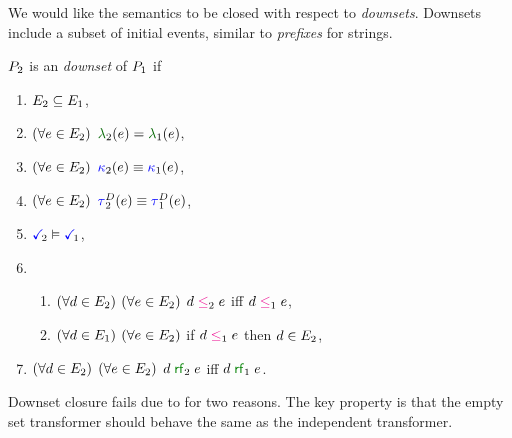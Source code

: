 We would like the semantics to be closed with respect to \emph{downsets}.
Downsets include a subset of initial events, similar to \emph{prefixes} for
strings.
\begin{definition}
  \label{def:downset}
  $P_2$ is an \emph{downset} of $P_1$ if
  \begin{multicols}{2}
    \begin{enumerate}
    \item $E_2\subseteq E_1$,
    \item $(\forall e\in E_2)$ $\labelingAct_2(\aEv)=\labelingAct_1(\aEv)$,
    \item $(\forall e\in E_2)$ ${\color{blue}\kappa}_2(e)\mathrel{\equiv}{\color{blue}\kappa}_1(e)$,
    \item $(\forall e\in E_2)$ $\aTr[2]{\bEvs}{\aEv}\riff\aTr[1]{\bEvs}{\aEv}$,
    \item $\aTerm[2] \rimplies \aTerm[1]$,
    \item[] 
      \begin{enumerate}[leftmargin=0pt]
      \item $(\forall d\in E_2)$ $(\forall e\in E_2)$ $\bEv\le_2\aEv$ iff $\bEv\le_1\aEv$,
      \item $(\forall d\in E_1)$ $(\forall e\in E_2)$ if
        $\bEv\le_1\aEv$ then $d\in E_2$,
      \end{enumerate}
    \item $(\forall d\in E_2)$ $(\forall e\in E_2)$ $\bEv\rrfx_2\aEv$ iff $\bEv\rrfx_1\aEv$.
    \end{enumerate}
  \end{multicols}
\end{definition}

Downset closure fails due to for two reasons.  The key property is that the
empty set transformer should behave the same as the independent transformer.


